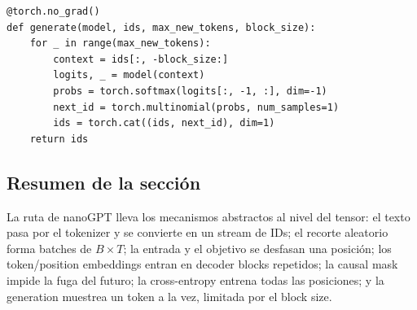 \begin{lstlisting}[caption={Autoregressive generation con context cropping limitado.}]
@torch.no_grad()
def generate(model, ids, max_new_tokens, block_size):
    for _ in range(max_new_tokens):
        context = ids[:, -block_size:]
        logits, _ = model(context)
        probs = torch.softmax(logits[:, -1, :], dim=-1)
        next_id = torch.multinomial(probs, num_samples=1)
        ids = torch.cat((ids, next_id), dim=1)
    return ids
\end{lstlisting}


\subsection{Resumen de la sección}

La ruta de nanoGPT lleva los mecanismos abstractos al nivel del tensor: el texto pasa por el tokenizer y se convierte en un stream de IDs; el recorte aleatorio forma batches de $B\times T$; la entrada y el objetivo se desfasan una posición; los token/position embeddings entran en decoder blocks repetidos; la causal mask impide la fuga del futuro; la cross-entropy entrena todas las posiciones; y la generation muestrea un token a la vez, limitada por el block size.
